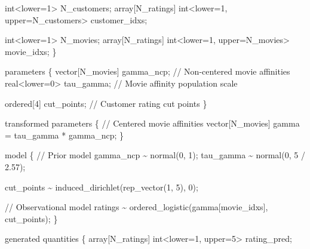 \documentclass[
  letterpaper,
  DIV=11,
  numbers=noendperiod]{scrartcl}
\newenvironment{Shaded}{\begin{snugshade}}{\end{snugshade}}
\newcommand{\CommentTok}[1]{\textcolor[rgb]{0.37,0.37,0.37}{#1}}
\newcommand{\DataTypeTok}[1]{\textcolor[rgb]{0.68,0.00,0.00}{#1}}
\newcommand{\DecValTok}[1]{\textcolor[rgb]{0.68,0.00,0.00}{#1}}
\newcommand{\FloatTok}[1]{\textcolor[rgb]{0.68,0.00,0.00}{#1}}
\newcommand{\KeywordTok}[1]{\textcolor[rgb]{0.00,0.23,0.31}{#1}}
\newcommand{\NormalTok}[1]{\textcolor[rgb]{0.00,0.23,0.31}{#1}}
\begin{document}
\begin{codelisting}
\begin{Shaded}
\begin{Highlighting}[]
  \DataTypeTok{int}\NormalTok{\textless{}}\KeywordTok{lower}\NormalTok{=}\DecValTok{1}\NormalTok{\textgreater{} N\_customers;}
  \DataTypeTok{array}\NormalTok{[N\_ratings] }\DataTypeTok{int}\NormalTok{\textless{}}\KeywordTok{lower}\NormalTok{=}\DecValTok{1}\NormalTok{, }\KeywordTok{upper}\NormalTok{=N\_customers\textgreater{} customer\_idxs;}

  \DataTypeTok{int}\NormalTok{\textless{}}\KeywordTok{lower}\NormalTok{=}\DecValTok{1}\NormalTok{\textgreater{} N\_movies;}
  \DataTypeTok{array}\NormalTok{[N\_ratings] }\DataTypeTok{int}\NormalTok{\textless{}}\KeywordTok{lower}\NormalTok{=}\DecValTok{1}\NormalTok{, }\KeywordTok{upper}\NormalTok{=N\_movies\textgreater{} movie\_idxs;}
\NormalTok{\}}

\KeywordTok{parameters}\NormalTok{ \{}
  \DataTypeTok{vector}\NormalTok{[N\_movies] gamma\_ncp; }\CommentTok{// Non{-}centered movie affinities}
  \DataTypeTok{real}\NormalTok{\textless{}}\KeywordTok{lower}\NormalTok{=}\DecValTok{0}\NormalTok{\textgreater{} tau\_gamma;    }\CommentTok{// Movie affinity population scale}

  \DataTypeTok{ordered}\NormalTok{[}\DecValTok{4}\NormalTok{] cut\_points;      }\CommentTok{// Customer rating cut points}
\NormalTok{\}}

\KeywordTok{transformed parameters}\NormalTok{ \{}
  \CommentTok{// Centered movie affinities}
  \DataTypeTok{vector}\NormalTok{[N\_movies] gamma = tau\_gamma * gamma\_ncp;}
\NormalTok{\}}

\KeywordTok{model}\NormalTok{ \{}
  \CommentTok{// Prior model}
\NormalTok{  gamma\_ncp \textasciitilde{} normal(}\DecValTok{0}\NormalTok{, }\DecValTok{1}\NormalTok{);}
\NormalTok{  tau\_gamma \textasciitilde{} normal(}\DecValTok{0}\NormalTok{, }\DecValTok{5}\NormalTok{ / }\FloatTok{2.57}\NormalTok{);}

\NormalTok{  cut\_points \textasciitilde{} induced\_dirichlet(rep\_vector(}\DecValTok{1}\NormalTok{, }\DecValTok{5}\NormalTok{), }\DecValTok{0}\NormalTok{);}

  \CommentTok{// Observational model}
\NormalTok{  ratings \textasciitilde{} ordered\_logistic(gamma[movie\_idxs], cut\_points);}
\NormalTok{\}}

\KeywordTok{generated quantities}\NormalTok{ \{}
  \DataTypeTok{array}\NormalTok{[N\_ratings] }\DataTypeTok{int}\NormalTok{\textless{}}\KeywordTok{lower}\NormalTok{=}\DecValTok{1}\NormalTok{, }\KeywordTok{upper}\NormalTok{=}\DecValTok{5}\NormalTok{\textgreater{} rating\_pred;}


\end{Highlighting}
\end{Shaded}
\end{codelisting}
\end{document}
